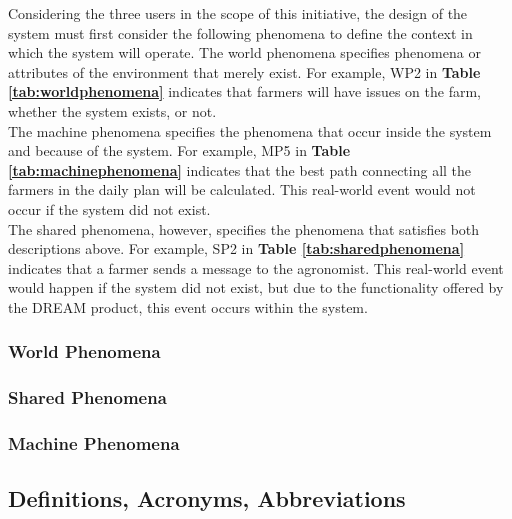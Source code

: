 \begin{flushleft} 
Considering the three users in the scope of this initiative, the design of the system must first consider the following phenomena to define the context in which the system will operate. 
The world phenomena specifies phenomena or attributes of the environment that merely exist. For example, WP2 in \textbf{Table \ref{tab:worldphenomena}} indicates that farmers will have issues on the farm, whether the system exists, or not.\\ 
The machine phenomena specifies the phenomena that occur inside the system and because of the system. For example, MP5 in \textbf{Table \ref{tab:machinephenomena}} indicates that the best path connecting all the farmers in the daily plan will be calculated. This real-world event would not occur if the system did not exist. \\
The shared phenomena, however, specifies the phenomena that satisfies both descriptions above. For example, SP2 in \textbf{Table \ref{tab:sharedphenomena}} indicates that a farmer sends a message to the agronomist. This real-world event would happen if the system did not exist, but due to the functionality offered by the DREAM product, this event occurs within the system. 
\end{flushleft}

\subsubsection{World Phenomena}


\subsubsection{Shared Phenomena}


\subsubsection{Machine Phenomena}


\subsection{Definitions, Acronyms, Abbreviations}

